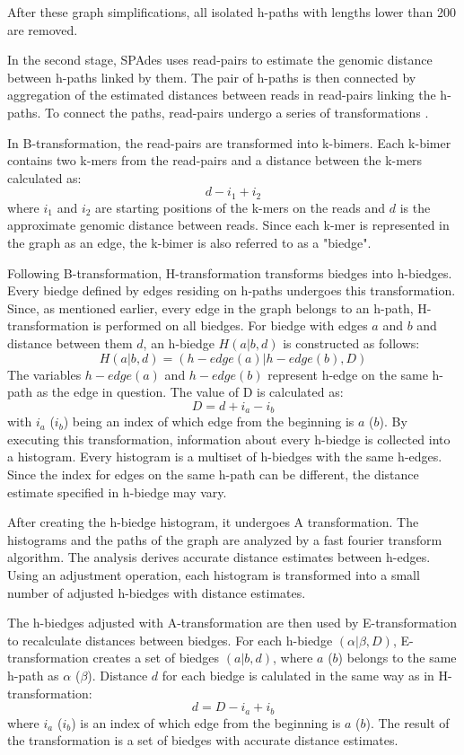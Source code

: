 After these graph simplifications, all isolated h-paths with lengths lower than 200 are removed.

In the second stage, SPAdes uses read-pairs to estimate the genomic distance between h-paths linked by them. The pair of h-paths is then connected by aggregation of the estimated distances between reads in read-pairs linking the h-paths. To connect the paths, read-pairs undergo a series of transformations \cite{bankevich2012spades}. 

In B-transformation, the read-pairs are transformed into k-bimers. Each k-bimer contains two k-mers from the read-pairs and a distance between the k-mers calculated as:
\[d - i_{1} + i_{2}\]
where $i_{1}$ and $i_{2}$ are starting positions of the k-mers on the reads and $d$ is the approximate genomic distance between reads. Since each k-mer is represented in the graph as an edge, the k-bimer is also referred to as a "biedge".

Following B-transformation, H-transformation transforms biedges into h-biedges. Every biedge defined by edges residing on h-paths undergoes this transformation. Since, as mentioned earlier, every edge in the graph belongs to an h-path, H-transformation is performed on all biedges. For biedge with edges $a$ and $b$ and distance between them $d$, an h-biedge $H(a|b,d)$ is constructed as follows:
\[ H(a|b,d) = (h-edge(a)|h-edge(b),D) \]
The variables $h-edge(a)$ and $h-edge(b)$ represent h-edge on the same h-path as the edge in question. The value of D is calculated as:
\[D = d + i_{a} - i_{b}\]
with $i_{a}$ ($i_{b}$) being an index of which edge from the beginning is $a$ ($b$). By executing this transformation, information about every h-biedge is collected into a histogram. Every histogram is a multiset of h-biedges with the same h-edges. Since the index for edges on the same h-path can be different, the distance estimate specified in h-biedge may vary.

After creating the h-biedge histogram, it undergoes A transformation. The histograms and the paths of the graph are analyzed by a fast fourier transform algorithm. The analysis derives accurate distance estimates between h-edges. Using an adjustment operation, each histogram is transformed into a small number of adjusted h-biedges with distance estimates.

The h-biedges adjusted with A-transformation are then used by E-transformation to recalculate distances between biedges. For each h-biedge $(\alpha|\beta,D)$, E-transformation creates a set of biedges $(a|b,d)$, where $a$ ($b$) belongs to the same h-path as $\alpha$ ($\beta$). Distance $d$ for each biedge is calulated in the same way as in H-transformation:
\[ d = D - i_{a} + i_{b} \]
where $i_{a}$ ($i_{b}$) is an index of which edge from the beginning is $a$ ($b$). The result of the transformation is a set of biedges with accurate distance estimates.

